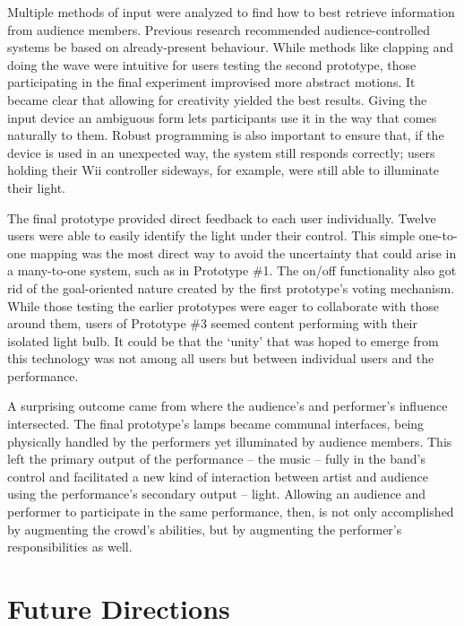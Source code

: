 Multiple methods of input were analyzed to find how to best retrieve information from audience members. Previous research recommended audience-controlled systems be based on already-present behaviour. While methods like clapping and doing the wave were intuitive for users testing the second prototype, those participating in the final experiment improvised more abstract motions. It became clear that allowing for creativity yielded the best results. Giving the input device an ambiguous form lets participants use it in the way that comes naturally to them. Robust programming is also important to ensure that, if the device is used in an unexpected way, the system still responds correctly; users holding their Wii controller sideways, for example, were still able to illuminate their light.

The final prototype provided direct feedback to each user individually. Twelve users were able to easily identify the light under their control. This simple one-to-one mapping was the most direct way to avoid the uncertainty that could arise in a many-to-one system, such as in Prototype \#1. The on/off functionality also got rid of the goal-oriented nature created by the first prototype's voting mechanism. While those testing the earlier prototypes were eager to collaborate with those around them, users of Prototype \#3 seemed content performing with their isolated light bulb. It could be that the `unity' that was hoped to emerge from this technology was not among all users but between individual users and the performance.

A surprising outcome came from where the audience's and performer's influence intersected. The final prototype's lamps became communal interfaces, being physically handled by the performers yet illuminated by audience members. This left the primary output of the performance -- the music -- fully in the band's control and facilitated a new kind of interaction between artist and audience using the performance's secondary output -- light. Allowing an audience and performer to participate in the same performance, then, is not only accomplished by augmenting the crowd's abilities, but by augmenting the performer's responsibilities as well.


\section{Future Directions}

